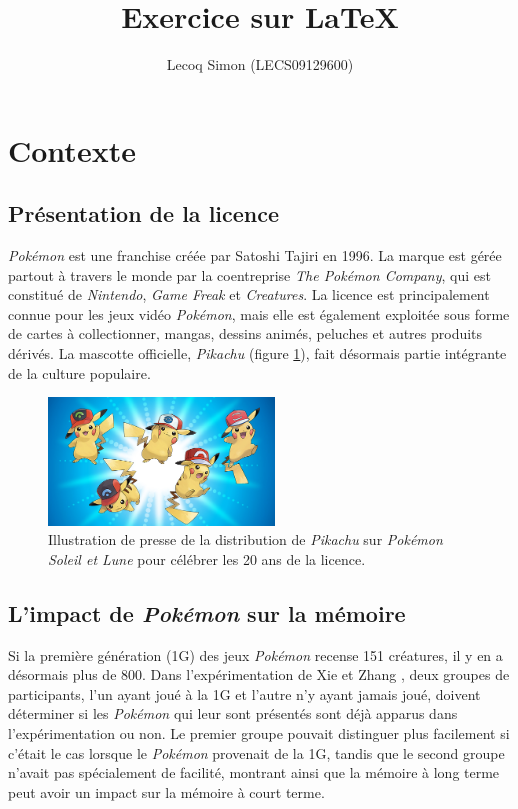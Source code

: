\documentclass[a4paper,11pt]{article}
\title{Exercice sur LaTeX}
\author{Lecoq Simon (LECS09129600)}
\date{}
\begin{document}
    \maketitle

    \section{Contexte}\label{section:context}
    
      \subsection{Présentation de la licence}
      \textit{Pokémon}  est une franchise créée par Satoshi Tajiri en 1996. 
      La marque est gérée partout à travers le monde par la coentreprise \textit{The Pokémon Company}, qui est constitué de \textit{Nintendo}, \textit{Game Freak} et \textit{Creatures}.
      La licence est principalement connue pour les jeux vidéo \textit{Pokémon}, mais elle est également exploitée sous forme de cartes à collectionner, mangas, dessins animés, peluches et autres produits dérivés.
      La mascotte officielle, \textit{Pikachu} (figure \ref{fig:pikachu}), fait désormais partie intégrante de la culture populaire.

      \vspace{1em}
      \begin{figure}
        \centering
        \includegraphics[width=6cm]{images/pikachu.jpg}
        \caption{Illustration de presse de la distribution de \textit{Pikachu} sur \textit{Pokémon Soleil et Lune} pour célébrer les 20 ans de la licence.}
        \label{fig:pikachu}
      \end{figure}

      \subsection{L'impact de \textit{Pokémon} sur la mémoire}
      Si la première génération (1G) des jeux \textit{Pokémon} recense 151 créatures, il y en a désormais plus de 800.
      Dans l'expérimentation de Xie et Zhang \cite{xie_zhang}, deux groupes de participants, l'un ayant joué à la 1G et l'autre n'y ayant jamais joué, doivent déterminer si les \textit{Pokémon} qui leur sont présentés sont déjà apparus dans l'expérimentation ou non.
      Le premier groupe pouvait distinguer plus facilement si c'était le cas lorsque le \textit{Pokémon} provenait de la 1G, tandis que le second groupe n'avait pas spécialement de facilité, montrant ainsi que la mémoire à long terme peut avoir un impact sur la mémoire à court terme.
\end{document}
